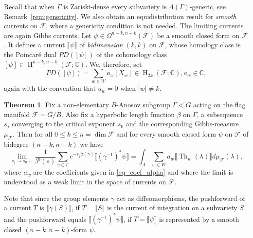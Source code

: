\documentclass[12pt]{amsbook}%
\theoremstyle{definition}
\newtheorem{introthm}{Theorem}
\theoremstyle{remark}
\numberwithin{section}{chapter}
\numberwithin{subsection}{section}
\numberwithin{figure}{chapter}
\DeclareMathOperator{\Th}{Th}
\DeclareMathOperator{\coh}{H}
\newtheorem{conjecture}{Conjecture}
\def\cF{{\mathscr{F}}}
\def\Ga{\Gamma}
\def\ga{\gamma}
\def\La{\Lambda}
\def\la{\lambda}
\def\Om{\Omega}
\begin{document}


\medskip
Recall that when $\Gamma$ is Zariski-dense every subvariety is $\Lambda(\Ga)$-generic, see Remark~\ref{rem:genericity}. 
We also obtain an equidistribution result for {\em smooth} currents on $\cF$, where a genericity condition is not needed. The limiting currents are again Gibbs currents. Let $\psi\in \Om^{n-k,n-k}(\cF)$ be a smooth closed %
form on $\cF$. It defines a current $\llbracket\psi\rrbracket$ of {\em bidimension} $(k,k)$  on $\cF$, whose homology 
class is the Poincar\'e dual $PD([\psi])$ of the cohomology 
class $[\psi]\in \coh^{n-k,n-k}(\cF; \mathbb C)$.  We, therefore, set 
\begin{equation}\label{eq_coef_alpha}
PD([\psi])= \sum_{w\in W} a_w [X_w]\in \coh_{2k}(\cF; \mathbb C), a_w\in {\mathbb C},   
\end{equation}
again with the convention that $a_w=0$ when $|w|\ne k$. 

\begin{introthm}\label{thm:main smooth} Fix a non-elementary $B$-Anosov  subgroup $\Gamma< G$ acting on the flag manifold $\cF=G/B$. 
Also fix a hyperbolic length function $\beta$ on $\Ga$, a subsequence $s_j$ converging to the critical exponent $s_0$ and the corresponding Gibbs-measure $\mu_{\cF}$. 
 Then for all $0\leqslant k\leqslant n = \dim \cF$ and for every smooth closed form $\psi$ on $\cF$  of bidegree $(n-k, n-k)$ we have   
$$
\lim_{s_j\to s_0+} \frac{1}{{\mathcal P}(s)} \sum_{\ga\in \Ga} e^{-s_j\beta(\ga)} \llbracket (\ga^{-1})^*\psi\rrbracket= \int_{\La}  \sum_{w\in W}  a_w \llbracket\Th_w(\la) \rrbracket d\mu_{\cF}(\la),
$$
where $a_w$ are the coefficients given in \eqref{eq_coef_alpha} and
where the limit is understood as a weak limit in the space of currents on $\cF$. 
  \end{introthm}

Note that since the  group elements $\gamma$ act as diffeomorphisms, the pushforward of  a current $T$ is $\llbracket \gamma(S) \rrbracket$, if $T = \llbracket S\rrbracket$ is the current of integration on a subvariety $S$ and the pushforward equals $\llbracket(\gamma^{-1})^* \psi\rrbracket$, if $T=\llbracket\psi\rrbracket$ is represented by a smooth closed $(n-k,n-k)$-form $\psi$.
\end{document}

